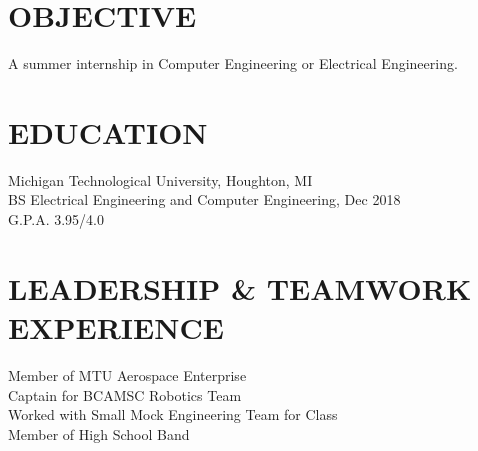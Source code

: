 \documentclass[letterpaper]{res}
\begin{document}
 


\address{\bf  PRESENT ADDRESS \\ 51280 Blue Top Cabin Rd \\ Houghton, MI 49931}
\address{\bf PERMANENT ADDRESS \\ 14200 Stone Jug Road \\  Battle Creek, MI 49015 \\  (269) 262-6098 \\ jaevanko@mtu.edu}
                                  
\begin{resume}

\section{OBJECTIVE}          
    A summer internship in Computer Engineering or Electrical Engineering.          
 
\section{EDUCATION}          
    Michigan Technological University, Houghton, MI  \\        
    BS Electrical Engineering and Computer Engineering, Dec 2018   \\      
    G.P.A. 3.95/4.0          

\section{LEADERSHIP \& TEAMWORK EXPERIENCE}
	Member of MTU Aerospace Enterprise \\
	Captain for BCAMSC Robotics Team \\
	Worked with Small Mock Engineering Team for Class \\
	Member of High School Band



\end{resume}
\end{document}
